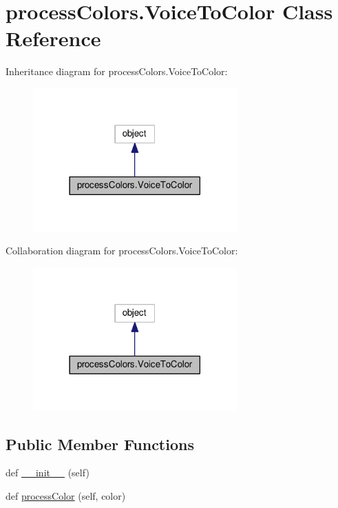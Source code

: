 \hypertarget{classprocessColors_1_1VoiceToColor}{}\section{process\+Colors.\+Voice\+To\+Color Class Reference}
\label{classprocessColors_1_1VoiceToColor}


Inheritance diagram for process\+Colors.\+Voice\+To\+Color\+:\nopagebreak
\begin{figure}[H]
\begin{center}
\leavevmode
\includegraphics[width=222pt]{classprocessColors_1_1VoiceToColor__inherit__graph}
\end{center}
\end{figure}


Collaboration diagram for process\+Colors.\+Voice\+To\+Color\+:\nopagebreak
\begin{figure}[H]
\begin{center}
\leavevmode
\includegraphics[width=222pt]{classprocessColors_1_1VoiceToColor__coll__graph}
\end{center}
\end{figure}
\subsection*{Public Member Functions}
\begin{DoxyCompactItemize}
\item 
def \hyperlink{classprocessColors_1_1VoiceToColor_abe7cd55778b568c1902f04d1fb6f83f1}{\+\_\+\+\_\+init\+\_\+\+\_\+} (self)
\item 
def \hyperlink{classprocessColors_1_1VoiceToColor_a76d0439d776fc090dd47bdfad6dbabd7}{process\+Color} (self, color)
\end{DoxyCompactItemize}
